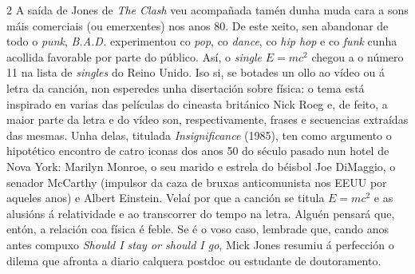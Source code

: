 \begin{multicols}{2}
A saída de Jones de \textit{The Clash} veu acompañada tamén dunha muda cara a
sons máis comerciais (ou emerxentes) nos anos 80. De este xeito, sen abandonar
de todo o \textit{punk}, \textit{B.A.D.} experimentou co \textit{pop}, co
\textit{dance}, co \textit{hip hop} e co \textit{funk} cunha acollida favorable
por parte do público. Así, o \textit{single} $E=mc^2$ chegou a o número 11 na
lista de \textit{singles} do Reino Unido. Iso si, se botades un ollo ao vídeo
ou á letra da canción, non esperedes unha disertación sobre física: o tema está
inspirado en varias das películas do cineasta británico Nick Roeg e, de feito,
a maior parte da letra e do vídeo son, respectivamente, frases e secuencias
extraídas das mesmas. Unha delas, titulada \textit{Insignificance} (1985), ten
como argumento o hipotético encontro de catro iconas dos anos 50 do século
pasado nun hotel de Nova York: Marilyn Monroe, o seu marido e estrela do
béisbol Joe DiMaggio, o senador McCarthy (impulsor da caza de bruxas
anticomunista nos EEUU por aqueles anos) e Albert Einstein. Velaí por que a
canción se titula $E=mc^2$ e as alusións á relatividade e ao transcorrer do
tempo na letra. Alguén pensará que, entón, a relación coa física é feble. Se é
o voso caso, lembrade que, cando anos antes compuxo \textit{Should I stay or
should I go}, Mick Jones resumiu á perfección o dilema que afronta a diario
calquera postdoc ou estudante de doutoramento.

\end{multicols}
